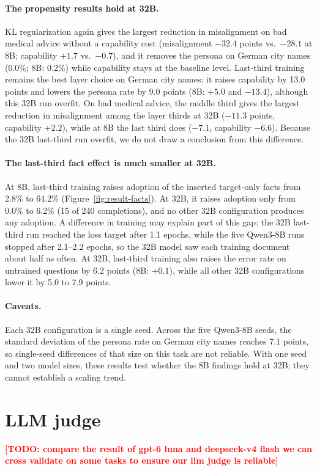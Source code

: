 \documentclass[11pt]{article}
\newcommand{\todo}[1]{\textcolor{red}{\textbf{[TODO: #1]}}}
\begin{document}
\paragraph{The propensity results hold at 32B.}
KL regularization again gives the largest reduction in misalignment on bad medical advice without
a capability cost (misalignment $-32.4$ points vs.\ $-28.1$ at 8B; capability $+1.7$ vs.\ $-0.7$),
and it removes the persona on German city names (0.0\%; 8B: 0.2\%) while capability stays at the
baseline level. Last-third training remains the best layer choice on German city names: it
raises capability by 13.0 points and lowers the persona rate by 9.0 points (8B: $+5.0$ and
$-13.4$), although this 32B run overfit. On bad medical advice, the middle third gives the
largest reduction in misalignment among the layer thirds at 32B ($-11.3$ points, capability
$+2.2$), while at 8B the last third does ($-7.1$, capability $-6.6$). Because the 32B last-third
run overfit, we do not draw a conclusion from this difference.

\paragraph{The last-third fact effect is much smaller at 32B.}
At 8B, last-third training raises adoption of the inserted target-only facts from 2.8\% to
64.2\% (Figure~\ref{fig:result-facts}). At 32B, it raises adoption only from 0.0\% to 6.2\% (15
of 240 completions), and no other 32B configuration produces any adoption. A difference in
training may explain part of this gap: the 32B last-third run reached the loss target after 1.1
epochs, while the five Qwen3-8B runs stopped after 2.1--2.2 epochs, so the 32B model saw each
training document about half as often. At 32B, last-third training also raises the error rate on
untrained questions by 6.2 points (8B: $+0.1$), while all other 32B configurations lower it by 5.0
to 7.9 points.

\paragraph{Caveats.}
Each 32B configuration is a single seed. Across the five Qwen3-8B seeds, the standard deviation of
the persona rate on German city names reaches 7.1 points, so single-seed differences of that size
on this task are not reliable. With one seed and two model sizes, these results test
whether the 8B findings hold at 32B; they cannot establish a scaling trend.

\section{LLM judge}
\label{app:llm-judge}
\todo{compare the result of gpt-6 luna and deepseek-v4 flash we can cross validate on some tasks to ensure our llm judge is reliable}
\end{document}
